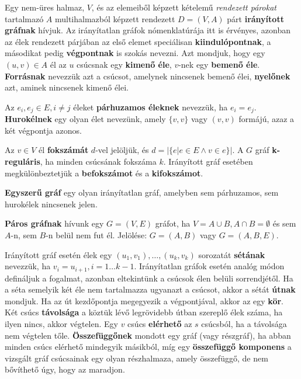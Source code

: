 \begin{definition}
Egy nem-üres halmaz, $V$, és az elemeiből képzett kételemű \textit{rendezett párokat} tartalmazó $A$ multihalmazból képzett rendezett $D=(V,A)$ párt \textbf{irányított gráfnak} hívjuk. Az irányítatlan gráfok nómenklatúrája itt is érvényes, azonban az élek rendezett párjában az első elemet speciálisan \textbf{kiindulópontnak}, a másodikat pedig \textbf{végpontnak} is szokás nevezni. Azt mondjuk, hogy egy $(u, v) \in A$ él az $u$ csúcsnak egy \textbf{kimenő éle}, $v$-nek egy \textbf{bemenő éle}. \textbf{Forrásnak} nevezzük azt a csúcsot, amelynek nincsenek bemenő élei, \textbf{nyelőnek} azt, aminek nincsenek kimenő élei.
\end{definition}

\begin{definition}
Az $e_i, e_j \in E, i \neq j$ éleket \textbf{párhuzamos éleknek} nevezzük, ha $e_i=e_j$. \textbf{Hurokélnek} egy olyan élet nevezünk, amely $\{v, v\}$ vagy $(v, v)$ formájú, azaz a két végpontja azonos.
\end{definition}

\begin{definition}
Az $v \in V$ él \textbf{fokszámát} $d$-vel jelöljük, és $d=| \{ e | e \in E \land v \in e \}|$. A $G$ gráf \textbf{k-reguláris}, ha minden csúcsának fokszáma $k$. Irányított gráf esetében megkülönbeztetjük a \textbf{befokszámot} és a \textbf{kifokszámot}.
\end{definition}

\begin{definition}
\textbf{Egyszerű gráf} egy olyan irányítatlan gráf, amelyben sem párhuzamos, sem hurokélek nincsenek jelen.
\end{definition}

\begin{definition}
\textbf{Páros gráfnak} hívunk egy $G=(V,E)$ gráfot, ha $V=A \cup B, A \cap B = \emptyset$ és sem $A$-n, sem $B$-n belül nem fut él. Jelölése: $G=(A,B)$ vagy $G=(A,B,E)$.
\end{definition}

\begin{definition}
Irányított gráf esetén élek egy $(u_1, v_1), \ldots, (u_k, v_k)$ sorozatát \textbf{sétának} nevezzük, ha $v_i=u_{i+1}, i=1 \ldots k-1$. Irányítatlan gráfok esetén analóg módon defináljuk a fogalmat, azonban eltekintünk a csúcsok élen belüli sorrendjétől. Ha a séta semelyik két éle nem tartalmazza ugyanazt a csúcsot, akkor a sétát \textbf{útnak} mondjuk. Ha az út kezdőpontja megegyezik a végpontjával, akkor az egy \textbf{kör}. Két csúcs \textbf{távolsága} a köztük lévő legrövidebb útban szereplő élek száma, ha ilyen nincs, akkor végtelen. Egy $v$ csúcs \textbf{elérhető} az $s$ csúcsból, ha a távolsága nem végtelen tőle. \textbf{Összefüggőnek} mondott egy gráf (vagy részgráf), ha abban minden csúcs elérhető mindegyik másikból, míg egy \textbf{összefüggő komponens} a vizsgált gráf csúcsainak egy olyan részhalmaza, amely összefüggő, de nem bővíthető úgy, hogy az maradjon.
\end{definition}

